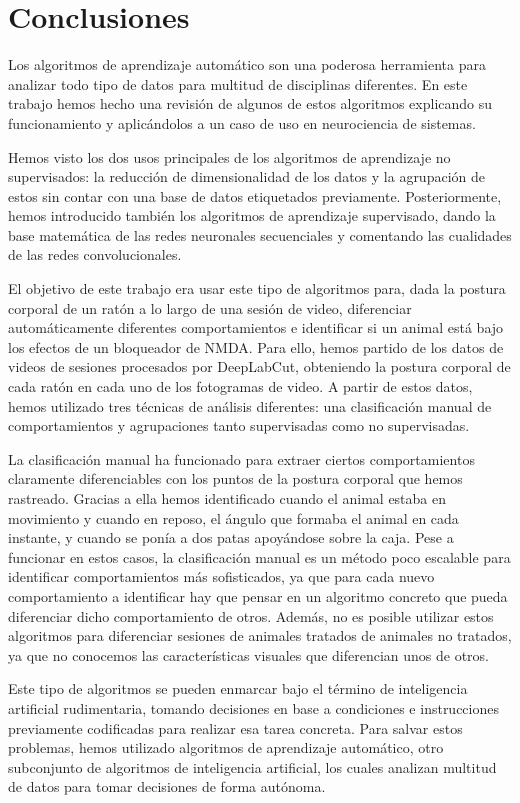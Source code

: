 \chapter{Conclusiones}

Los algoritmos de aprendizaje automático son una poderosa herramienta para analizar todo tipo de datos para multitud de disciplinas diferentes. En este trabajo hemos hecho una revisión de algunos de estos algoritmos explicando su funcionamiento y aplicándolos a un caso de uso en neurociencia de sistemas.

Hemos visto los dos usos principales de los algoritmos de aprendizaje no supervisados: la reducción de dimensionalidad de los datos y la agrupación de estos sin contar con una base de datos etiquetados previamente. Posteriormente, hemos introducido también los algoritmos de aprendizaje supervisado, dando la base matemática de las redes neuronales secuenciales y comentando las cualidades de las redes convolucionales.

El objetivo de este trabajo era usar este tipo de algoritmos para, dada la postura corporal de un ratón a lo largo de una sesión de video, diferenciar automáticamente diferentes comportamientos e identificar si un animal está bajo los efectos de un bloqueador de NMDA. Para ello, hemos partido de los datos de videos de sesiones procesados por DeepLabCut, obteniendo la postura corporal de cada ratón en cada uno de los fotogramas de video. A partir de estos datos, hemos utilizado tres técnicas de análisis diferentes: una clasificación manual de comportamientos y agrupaciones tanto supervisadas como no supervisadas.

La clasificación manual ha funcionado para extraer ciertos comportamientos claramente diferenciables con los puntos de la postura corporal que hemos rastreado. Gracias a ella hemos identificado cuando el animal estaba en movimiento y cuando en reposo, el ángulo que formaba el animal en cada instante, y cuando se ponía a dos patas apoyándose sobre la caja. Pese a funcionar en estos casos, la clasificación manual es un método poco escalable
para identificar comportamientos más sofisticados, ya que para cada nuevo comportamiento a identificar hay que pensar en un algoritmo concreto que pueda diferenciar dicho comportamiento de otros. Además, no es posible utilizar estos algoritmos para diferenciar sesiones de animales tratados de animales no tratados, ya que no conocemos las características visuales que diferencian unos de otros.

Este tipo de algoritmos se pueden enmarcar bajo el término de inteligencia artificial rudimentaria, tomando decisiones en base a condiciones e instrucciones previamente codificadas para realizar esa tarea concreta. Para salvar estos problemas, hemos utilizado algoritmos de aprendizaje automático, otro subconjunto de algoritmos de inteligencia artificial, los cuales analizan multitud de datos para tomar decisiones de forma autónoma.

